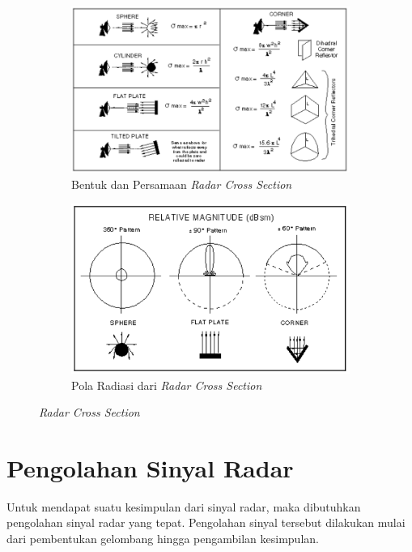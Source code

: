 \begin{center}
	\begin{figure}[h!]
		\begin{subfigure}[b]{0.5\linewidth}
			\includegraphics[width=\linewidth]{pics/bab2/rcsBentuk.png}
			\caption{Bentuk dan Persamaan \textit{Radar Cross Section}}
		\end{subfigure}
		\begin{subfigure}[b]{0.5\linewidth}
			\includegraphics[width=\linewidth]{pics/bab2/rcsPola.png}
			\caption{Pola Radiasi dari \textit{Radar Cross Section}}
		\end{subfigure}
		\caption[\textit{Radar Cross Section}]{\textit{Radar Cross Section} \cite{ONeill2012}}
		\label{pic:RCS}
	\end{figure}
\end{center}

\section{Pengolahan Sinyal Radar}
Untuk mendapat suatu kesimpulan dari sinyal radar, maka dibutuhkan pengolahan sinyal radar yang tepat. Pengolahan sinyal tersebut dilakukan mulai dari pembentukan gelombang hingga pengambilan kesimpulan. 

